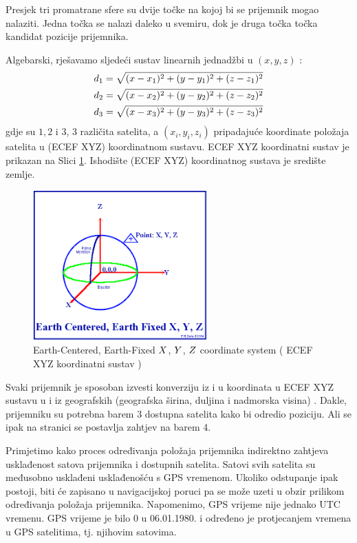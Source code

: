 \documentclass[a4paper,twoside,12pt]{memoir} %
\begin{document}
	Presjek tri promatrane sfere su dvije točke na kojoj bi se prijemnik mogao nalaziti.
	Jedna točka se nalazi daleko u svemiru, dok je druga točka točka kandidat pozicije prijemnika. 
	
	Algebarski, rješavamo sljedeći sustav linearnih jednadžbi u $(x,y,z)$ :
	\begin{align}\label{eq:position2}
	 d_1 = \sqrt{(x-x_1)^{2}+(y-y_1)^{2}+(z-z_1)^{2}} \notag \\
	 d_2 = \sqrt{(x-x_2)^{2}+(y-y_2)^{2}+(z-z_2)^{2}} \\
	 d_3 = \sqrt{(x-x_3)^{2}+(y-y_3)^{2}+(z-z_3)^{2}} \notag
	\end{align}
	gdje su $1,2 \text{ i }3$,  3 različita satelita, a $(x_i,y_i,z_i)$ pripadajuće
	koordinate položaja satelita u (ECEF XYZ) koordinatnom sustavu.
	ECEF XYZ koordinatni sustav je prikazan na Slici \ref{Fig:na}. Ishodište (ECEF XYZ) koordinatnog sustava je središte zemlje.
	
	\begin{figure}[H]
		\centering
		\includegraphics[width=0.6\textwidth]{ecefxyz.png}
		\caption{Earth-Centered, Earth-Fixed $\mathnormal{X}$, $\mathnormal{Y}$, $\mathnormal{Z}$ coordinate system ( ECEF XYZ koordinatni sustav ) \cite{GPS:overview}}
		\label{Fig:na}
	\end{figure}
	
	Svaki prijemnik je sposoban izvesti konverziju iz i u koordinata u ECEF XYZ sustavu 
	u i iz geografskih (geografska širina, duljina i nadmorska visina) \cite{GPS:overview}.
	Dakle, prijemniku su potrebna barem 3 dostupna satelita kako bi odredio poziciju.
	Ali se ipak na stranici \pageref{stranica:4satelita} se postavlja zahtjev na barem 4. 
	
	Primjetimo kako proces određivanja položaja prijemnika
	indirektno zahtjeva usklađenost satova prijemnika i dostupnih satelita.
	Satovi svih satelita su međusobno usklađeni usklađenošću s GPS vremenom. Ukoliko odstupanje ipak postoji, biti će zapisano u navigacijskoj poruci pa se može uzeti u obzir prilikom određivanja položaja prijemnika.
	Napomenimo, GPS vrijeme nije jednako UTC vremenu. GPS vrijeme je bilo 0 u 06.01.1980. i određeno je protjecanjem vremena u GPS satelitima, tj. njihovim 
	satovima. 
	
\end{document}
